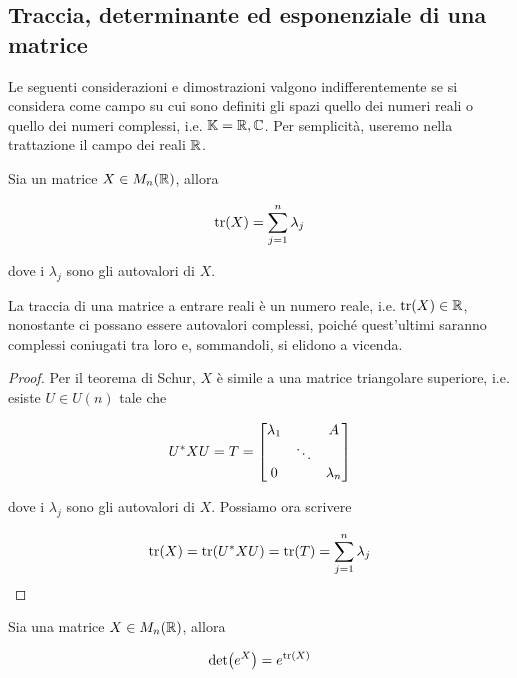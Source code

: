 \subsection{Traccia, determinante ed esponenziale di una matrice}

Le seguenti considerazioni e dimostrazioni valgono indifferentemente se si considera come campo su cui sono definiti gli spazi quello dei numeri reali o quello dei numeri complessi, i.e. $ \mathbb{K} = \mathbb{R},\mathbb{C} $. Per semplicità, useremo nella trattazione il campo dei reali $ \mathbb{R} $.

\begin{definition}
	Sia un matrice $ X \in M_{n}(\mathbb{R}) $, allora
	
	\begin{equation}
		\tr(X) = \sum_{j=1}^{n} \lambda_{j}
	\end{equation}
	
	dove i $ \lambda_{j} $ sono gli autovalori di $ X $.
\end{definition}

La traccia di una matrice a entrare reali è un numero reale, i.e. $ \tr(X) \in \mathbb{R} $, nonostante ci possano essere autovalori complessi, poiché quest'ultimi saranno complessi coniugati tra loro e, sommandoli, si elidono a vicenda.

\begin{proof}
	Per il teorema di Schur, $ X $ è simile a una matrice triangolare superiore, i.e. esiste $ U \in U(n) $ tale che
	
	\begin{equation}
		U^{*} X U = T = %
		\bmqty{ %
				\lambda_{1}	& & A \\
				& \ddots & \\
				0 & & \lambda_{n} %
				}
	\end{equation}
	
	dove i $ \lambda_{j} $ sono gli autovalori di $ X $. Possiamo ora scrivere
	
	\begin{equation}
		\tr(X) = \tr(U^{*} X U) %
		= \tr(T) %
		= \sum_{j=1}^{n} \lambda_{j}
	\end{equation}
\end{proof}

\begin{definition}
	Sia una matrice $ X \in M_{n}(\mathbb{R}) $, allora
	
	\begin{equation}
		\det(e^{X}) = e^{\tr(X)}
	\end{equation}
\end{definition}

